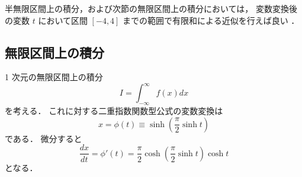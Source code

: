 半無限区間上の積分，および次節の無限区間上の積分においては，
変数変換後の変数 $t$ において区間 $[-4, 4]$ までの範囲で有限和による近似を行えば良い
\cite[4.5.3]{Press2007}．

\subsection{無限区間上の積分}

1 次元の無限区間上の積分
\begin{equation}
    I = \int_{-\infty}^{\infty} f(x) dx
\end{equation}
を考える．
これに対する二重指数関数型公式の変数変換は
\begin{equation}
    x = \phi(t) \equiv \sinh \left(\frac{\pi}{2} \sinh{t}\right)
\end{equation}
である\cite[Section 4.5.3]{Press2007}．
微分すると
\begin{equation}
    \frac{dx}{dt} = \phi'(t)
    = \frac{\pi}{2} \cosh \left(\frac{\pi}{2} \sinh{t}\right) \cosh{t}
\end{equation}
となる．
